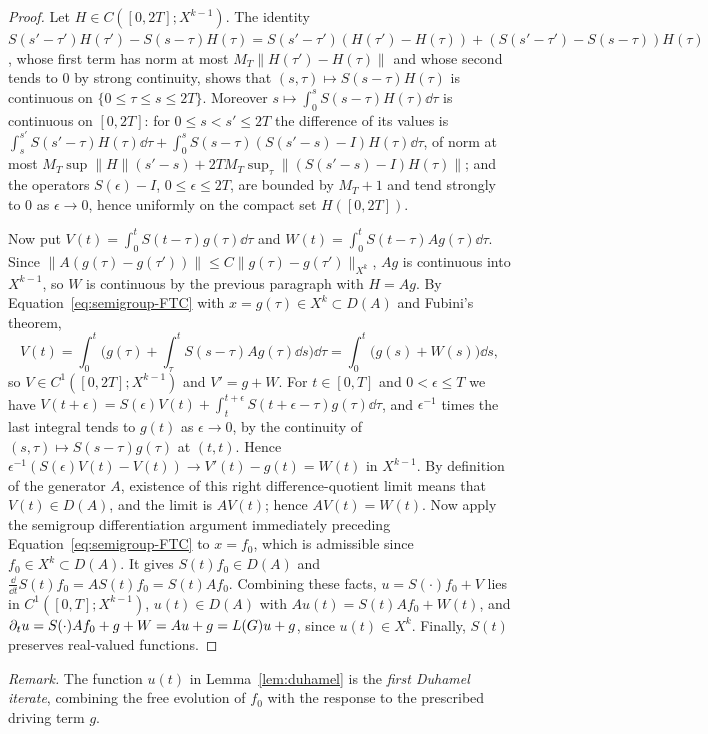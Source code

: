 \begin{proof}
Let $H\in C([0,2T];X^{k-1})$. The identity
$S(s'-\tau')H(\tau')-S(s-\tau)H(\tau)=S(s'-\tau')(H(\tau')-H(\tau))
+(S(s'-\tau')-S(s-\tau))H(\tau)$, whose first term has norm at most
$M_T\|H(\tau')-H(\tau)\|$ and whose second tends to $0$ by strong continuity,
shows that $(s,\tau)\mapsto S(s-\tau)H(\tau)$ is continuous on
$\{0\le\tau\le s\le2T\}$. Moreover
$s\mapsto\int_0^sS(s-\tau)H(\tau)\dd\tau$ is continuous on $[0,2T]$: for
$0\le s<s'\le2T$ the difference of its values is
$\int_s^{s'}S(s'-\tau)H(\tau)\dd\tau+\int_0^sS(s-\tau)(S(s'-s)-I)H(\tau)\dd\tau$,
of norm at most $M_T\sup\|H\|(s'-s)+2TM_T\sup_\tau\|(S(s'-s)-I)H(\tau)\|$; and the
operators $S(\epsilon)-I$, $0\le\epsilon\le2T$, are bounded by $M_T+1$ and tend strongly to
$0$ as $\epsilon\to0$, hence uniformly on the compact set $H([0,2T])$.

Now put $V(t)=\int_0^tS(t-\tau)g(\tau)\dd\tau$ and
$W(t)=\int_0^tS(t-\tau)Ag(\tau)\dd\tau$. Since
$\|A(g(\tau)-g(\tau'))\|\le C\|g(\tau)-g(\tau')\|_{X^k}$, $Ag$ is continuous
into $X^{k-1}$, so $W$ is continuous by the previous paragraph with $H=Ag$. By
Equation~\eqref{eq:semigroup-FTC} with $x=g(\tau)\in X^k\subset D(A)$ and Fubini's theorem,
\[
V(t)=\int_0^t\Big(g(\tau)+\int_\tau^tS(s-\tau)Ag(\tau)\dd s\Big)\dd\tau
=\int_0^t\big(g(s)+W(s)\big)\dd s ,
\]
so $V\in C^1([0,2T];X^{k-1})$ and $V'=g+W$. For $t\in[0,T]$ and $0<\epsilon\le T$ we have
$V(t+\epsilon)=S(\epsilon)V(t)+\int_t^{t+\epsilon}S(t+\epsilon-\tau)g(\tau)\dd\tau$, and $\epsilon^{-1}$ times the
last integral tends to $g(t)$ as $\epsilon\to0$, by the continuity of
$(s,\tau)\mapsto S(s-\tau)g(\tau)$ at $(t,t)$. Hence
$\epsilon^{-1}(S(\epsilon)V(t)-V(t))\to V'(t)-g(t)=W(t)$ in $X^{k-1}$.
By definition of the generator $A$, existence of this right difference-quotient
limit means that $V(t)\in D(A)$, and the limit is $AV(t)$; hence $AV(t)=W(t)$.
Now apply the semigroup differentiation argument immediately preceding
Equation~\eqref{eq:semigroup-FTC} to $x=f_0$, which is admissible since
$f_0\in X^k\subset D(A)$. It gives $S(t)f_0\in D(A)$ and
$\frac{\dd}{\dd t}S(t)f_0=AS(t)f_0=S(t)Af_0$.
Combining these facts, $u=S(\cdot)f_0+V$ lies in
$C^1([0,T];X^{k-1})$, $u(t)\in D(A)$ with $Au(t)=S(t)Af_0+W(t)$, and
$\partial_tu=S(\cdot)Af_0+g+W=Au+g=L(G)u+g$, since $u(t)\in X^k$. Finally, $S(t)$
preserves real-valued functions.
\end{proof}

\emph{Remark.} The function $u(t)$ in Lemma~\ref{lem:duhamel} is the
\emph{first Duhamel iterate}, combining the free evolution of $f_0$ with the
response to the prescribed driving term $g$.

